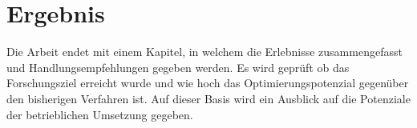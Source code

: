\section{Ergebnis}
Die Arbeit endet mit einem Kapitel, in welchem die Erlebnisse zusammengefasst und Handlungsempfehlungen gegeben werden.
Es wird geprüft ob das Forschungsziel erreicht wurde und wie hoch das Optimierungspotenzial gegenüber den bisherigen Verfahren ist.
Auf dieser Basis wird ein Ausblick auf die Potenziale der betrieblichen Umsetzung gegeben.
